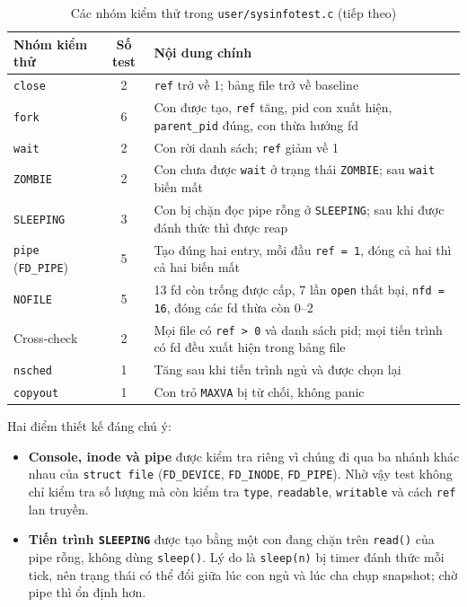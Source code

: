 \begin{table}[H]
    \centering
    \renewcommand{\arraystretch}{1.3}
    \setlength{\tabcolsep}{8pt}
    \begin{tabular}{|l|c|p{8cm}|}
        \hline
        \rowcolor[rgb]{0.8, 0.9, 1.0}
        \textbf{Nhóm kiểm thử} & \textbf{Số test} & \textbf{Nội dung chính} \\ \hline
        \texttt{close} & 2 & \texttt{ref} trở về 1; bảng file trở về baseline \\ \hline
        \texttt{fork} & 6 & Con được tạo, \texttt{ref} tăng, pid con xuất hiện, \texttt{parent\_pid} đúng, con thừa hưởng fd \\ \hline
        \texttt{wait} & 2 & Con rời danh sách; \texttt{ref} giảm về 1 \\ \hline
        \texttt{ZOMBIE} & 2 & Con chưa được \texttt{wait} ở trạng thái \texttt{ZOMBIE}; sau \texttt{wait} biến mất \\ \hline
        \texttt{SLEEPING} & 3 & Con bị chặn đọc pipe rỗng ở \texttt{SLEEPING}; sau khi được đánh thức thì được reap \\ \hline
        \texttt{pipe} (\texttt{FD\_PIPE}) & 5 & Tạo đúng hai entry, mỗi đầu \texttt{ref = 1}, đóng cả hai thì cả hai biến mất \\ \hline
        \texttt{NOFILE} & 5 & 13 fd còn trống được cấp, 7 lần \texttt{open} thất bại, \texttt{nfd = 16}, đóng các fd thừa còn 0–2 \\ \hline
        Cross-check & 2 & Mọi file có \texttt{ref > 0} và danh sách pid; mọi tiến trình có fd đều xuất hiện trong bảng file \\ \hline
        \texttt{nsched} & 1 & Tăng sau khi tiến trình ngủ và được chọn lại \\ \hline
        \texttt{copyout} & 1 & Con trỏ \texttt{MAXVA} bị từ chối, không panic \\ \hline
    \end{tabular}
    \caption{Các nhóm kiểm thử trong \texttt{user/sysinfotest.c} (tiếp theo)}
\end{table}

Hai điểm thiết kế đáng chú ý:

\begin{itemize}[itemsep=0pt, topsep=2.5pt, leftmargin=1.5cm]
    \item \textbf{Console, inode và pipe} được kiểm tra riêng vì chúng đi qua ba nhánh khác nhau của \texttt{struct file} (\texttt{FD\_DEVICE}, \texttt{FD\_INODE}, \texttt{FD\_PIPE}). Nhờ vậy test không chỉ kiểm tra số lượng mà còn kiểm tra \texttt{type}, \texttt{readable}, \texttt{writable} và cách \texttt{ref} lan truyền.
    \item \textbf{Tiến trình \texttt{SLEEPING}} được tạo bằng một con đang chặn trên \texttt{read()} của pipe rỗng, không dùng \texttt{sleep()}. Lý do là \texttt{sleep(n)} bị timer đánh thức mỗi tick, nên trạng thái có thể đổi giữa lúc con ngủ và lúc cha chụp snapshot; chờ pipe thì ổn định hơn.
\end{itemize}


